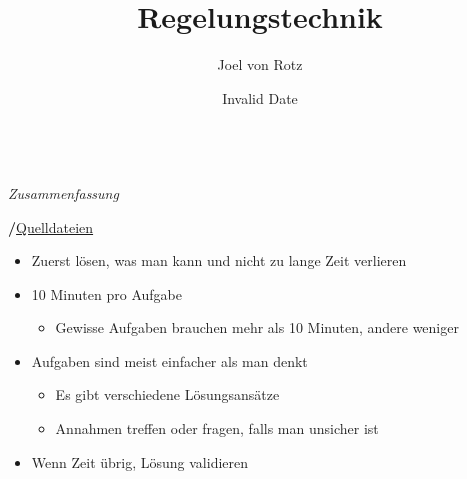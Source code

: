 \documentclass[
  10pt,
  a4paper,
  twocolumn]{article}
\title{Regelungstechnik}
\author{Joel von Rotz}
\date{Invalid Date}
\providecommand{\tightlist}{%
  \setlength{\itemsep}{0pt}\setlength{\parskip}{0pt}}\usepackage{longtable,booktabs,array}
\numberwithin{equation}{section}
\renewcommand*\contentsname{Inhaltsverzeichnis}
\newcommand\contentsname{Inhaltsverzeichnis}
\begin{document}

\makeatletter
\begin{center}
  \vspace*{0.5cm}
  
  \textbf{\Huge \@title}\\
  \vspace{0.1cm}
  \textsf{\textit{\large Zusammenfassung}}
  
  \vspace{0.5cm}

  \textsf{\large \@author \hspace{0.3cm}\textbf{/}\hspace{0.3cm}\large \faGithub\space \href{https://github.com/joelvonrotz/bachelor-electrical-engineering/tree/main/semester\%204/summary/regelungstechnik}{Quelldateien}}
  

\end{center}
\makeatother


\renewcommand*\contentsname{Inhaltsverzeichnis}
{
\hypersetup{linkcolor=}
\setcounter{tocdepth}{3}
\tableofcontents
}
\newpage

\begin{tcolorbox}[enhanced jigsaw, coltitle=black, colback=white, breakable, colframe=quarto-callout-tip-color-frame, rightrule=.15mm, left=2mm, opacityback=0, leftrule=.75mm, toptitle=1mm, colbacktitle=quarto-callout-tip-color!10!white, bottomtitle=1mm, arc=.35mm, bottomrule=.15mm, title=\textcolor{quarto-callout-tip-color}{\faLightbulb}\hspace{0.5em}{Vorgehen MEP}, titlerule=0mm, toprule=.15mm, opacitybacktitle=0.6]

\begin{itemize}
\tightlist
\item
  Zuerst lösen, was man kann und nicht zu lange Zeit verlieren
\item
  10 Minuten pro Aufgabe

  \begin{itemize}
  \tightlist
  \item
    Gewisse Aufgaben brauchen mehr als 10 Minuten, andere weniger
  \end{itemize}
\item
  Aufgaben sind meist einfacher als man denkt

  \begin{itemize}
  \tightlist
  \item
    Es gibt verschiedene Lösungsansätze
  \item
    Annahmen treffen oder fragen, falls man unsicher ist
  \end{itemize}
\item
  Wenn Zeit übrig, Lösung validieren
\end{itemize}

\end{tcolorbox}
\end{document}
